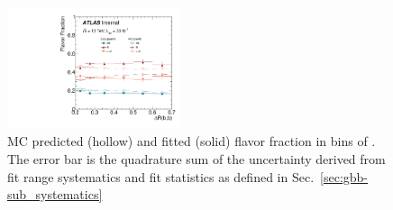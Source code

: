 \begin{figure}[htbp]
  \centering
 \includegraphics[width=0.45\textwidth]{figures/gbb/paperplots/Canv_dR_FracDataMC}
\caption{MC predicted (hollow) and fitted (solid) flavor fraction in bins of \drbb. The error bar is the quadrature sum of the uncertainty derived from fit range systematics and fit statistics as defined in Sec.~\ref{sec:gbb-sub_systematics}}
  \label{fig:dR-fitfrac}
\end{figure}

